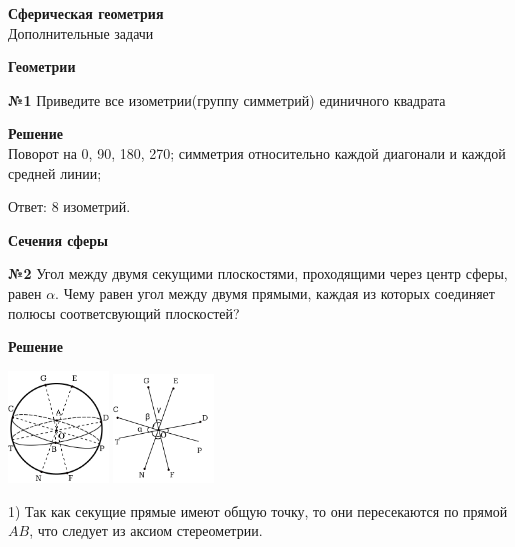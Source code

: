 


    \begin{center}
        \textbf{Сферическая геометрия }\\
        Дополнительные задачи
    \end{center}

    \begin{center}
        \textbf{Геометрии}
    \end{center}

    \textbf{№1}
    Приведите все изометрии(группу симметрий) единичного квадрата

    \textbf{Решение}\\

    Поворот на 0, 90, 180, 270; симметрия относительно каждой диагонали и каждой средней линии;

    Ответ: 8 изометрий.\\


    \begin{center}
        \textbf{Сечения сферы}
    \end{center}

    \textbf{№2}
    Угол между двумя секущими плоскостями, проходящими через центр сферы, равен $\alpha$.
    Чему равен угол между двумя прямыми,
    каждая из которых соединяет полюсы соответсвующий плоскостей?

    \textbf{Решение}\\

    \begin{center}
        \includegraphics[width=0.2\textwidth]{images/img3} \quad
        \includegraphics[width=0.2\textwidth]{images/img4}\\
    \end{center}

    1) Так как секущие прямые имеют общую точку, то они пересекаются по прямой $AB$, что следует из аксиом стереометрии.


